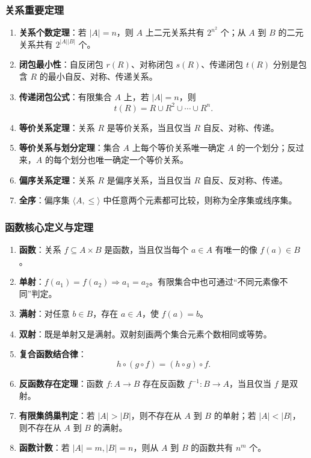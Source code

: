 \subsubsection{关系重要定理}

\begin{enumerate}
	\item \textbf{关系个数定理}：若 \(|A|=n\)，则 \(A\) 上二元关系共有 \(2^{n^2}\) 个；从 \(A\) 到 \(B\) 的二元关系共有 \(2^{|A||B|}\) 个。
	\item \textbf{闭包最小性}：自反闭包 \(r(R)\)、对称闭包 \(s(R)\)、传递闭包 \(t(R)\) 分别是包含 \(R\) 的最小自反、对称、传递关系。
	\item \textbf{传递闭包公式}：有限集合 \(A\) 上，若 \(|A|=n\)，则
	\[
	t(R)=R\cup R^2\cup\cdots\cup R^n.
	\]
	\item \textbf{等价关系定理}：关系 \(R\) 是等价关系，当且仅当 \(R\) 自反、对称、传递。
	\item \textbf{等价关系与划分定理}：集合 \(A\) 上每个等价关系唯一确定 \(A\) 的一个划分；反过来，\(A\) 的每个划分也唯一确定一个等价关系。
	\item \textbf{偏序关系定理}：关系 \(R\) 是偏序关系，当且仅当 \(R\) 自反、反对称、传递。
	\item \textbf{全序}：偏序集 \(\langle A,\le\rangle\) 中任意两个元素都可比较，则称为全序集或线序集。
\end{enumerate}

\subsubsection{函数核心定义与定理}

\begin{enumerate}
	\item \textbf{函数}：关系 \(f\subseteq A\times B\) 是函数，当且仅当每个 \(a\in A\) 有唯一的像 \(f(a)\in B\)。
	\item \textbf{单射}：\(f(a_1)=f(a_2)\Rightarrow a_1=a_2\)。有限集合中也可通过“不同元素像不同”判定。
	\item \textbf{满射}：对任意 \(b\in B\)，存在 \(a\in A\)，使 \(f(a)=b\)。
	\item \textbf{双射}：既是单射又是满射。双射刻画两个集合元素个数相同或等势。
	\item \textbf{复合函数结合律}：
	\[
	h\circ(g\circ f)=(h\circ g)\circ f.
	\]
	\item \textbf{反函数存在定理}：函数 \(f:A\to B\) 存在反函数 \(f^{-1}:B\to A\)，当且仅当 \(f\) 是双射。
	\item \textbf{有限集鸽巢判定}：若 \(|A|>|B|\)，则不存在从 \(A\) 到 \(B\) 的单射；若 \(|A|<|B|\)，则不存在从 \(A\) 到 \(B\) 的满射。
	\item \textbf{函数计数}：若 \(|A|=m,|B|=n\)，则从 \(A\) 到 \(B\) 的函数共有 \(n^m\) 个。
\end{enumerate}
